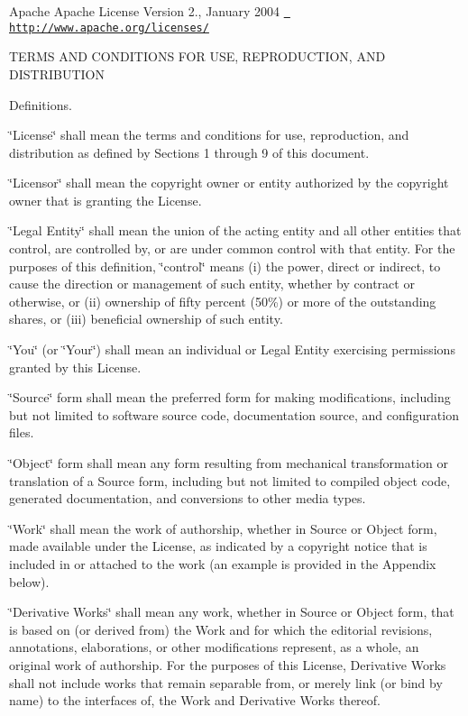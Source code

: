 Apache Apache License Version 2., January 2004 \href{http://www.apache.org/licenses/}{\texttt{ http\+://www.\+apache.\+org/licenses/}}

T\+E\+R\+MS A\+ND C\+O\+N\+D\+I\+T\+I\+O\+NS F\+OR U\+SE, R\+E\+P\+R\+O\+D\+U\+C\+T\+I\+ON, A\+ND D\+I\+S\+T\+R\+I\+B\+U\+T\+I\+ON


\begin{DoxyEnumerate}
\item Definitions.
\end{DoxyEnumerate}

\char`\"{}\+License\char`\"{} shall mean the terms and conditions for use, reproduction, and distribution as defined by Sections 1 through 9 of this document.

\char`\"{}\+Licensor\char`\"{} shall mean the copyright owner or entity authorized by the copyright owner that is granting the License.

\char`\"{}\+Legal Entity\char`\"{} shall mean the union of the acting entity and all other entities that control, are controlled by, or are under common control with that entity. For the purposes of this definition, \char`\"{}control\char`\"{} means (i) the power, direct or indirect, to cause the direction or management of such entity, whether by contract or otherwise, or (ii) ownership of fifty percent (50\%) or more of the outstanding shares, or (iii) beneficial ownership of such entity.

\char`\"{}\+You\char`\"{} (or \char`\"{}\+Your\char`\"{}) shall mean an individual or Legal Entity exercising permissions granted by this License.

\char`\"{}\+Source\char`\"{} form shall mean the preferred form for making modifications, including but not limited to software source code, documentation source, and configuration files.

\char`\"{}\+Object\char`\"{} form shall mean any form resulting from mechanical transformation or translation of a Source form, including but not limited to compiled object code, generated documentation, and conversions to other media types.

\char`\"{}\+Work\char`\"{} shall mean the work of authorship, whether in Source or Object form, made available under the License, as indicated by a copyright notice that is included in or attached to the work (an example is provided in the Appendix below).

\char`\"{}\+Derivative Works\char`\"{} shall mean any work, whether in Source or Object form, that is based on (or derived from) the Work and for which the editorial revisions, annotations, elaborations, or other modifications represent, as a whole, an original work of authorship. For the purposes of this License, Derivative Works shall not include works that remain separable from, or merely link (or bind by name) to the interfaces of, the Work and Derivative Works thereof.

